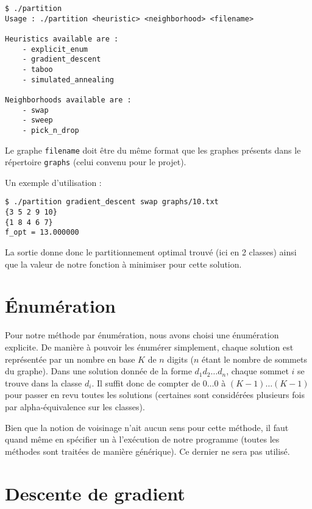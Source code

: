 \documentclass[12pt, a4paper]{article}
\begin{document}
\begin{verbatim}
$ ./partition 
Usage : ./partition <heuristic> <neighborhood> <filename>

Heuristics available are :
    - explicit_enum
    - gradient_descent
    - taboo
    - simulated_annealing

Neighborhoods available are :
    - swap
    - sweep
    - pick_n_drop
\end{verbatim}

Le graphe \texttt{filename} doit être du même format que les graphes présents dans le répertoire \texttt{graphs} (celui convenu pour le projet).

Un exemple d'utilisation :

\begin{verbatim}
$ ./partition gradient_descent swap graphs/10.txt
{3 5 2 9 10}
{1 8 4 6 7}
f_opt = 13.000000
\end{verbatim}

La sortie donne donc le partitionnement optimal trouvé (ici en 2 classes) ainsi que la valeur de notre fonction à minimiser pour cette solution.

\section{\'Enumération}
Pour notre méthode par énumération, nous avons choisi une énumération explicite. De manière à pouvoir les énumérer simplement, chaque solution est représentée par un nombre en base $K$ de $n$ digits ($n$ étant le nombre de sommets du graphe). Dans une solution donnée de la forme $d_1 d_2 \dots d_n$, chaque sommet $i$ se trouve dans la classe $d_i$. Il suffit donc de compter de $0 \dots 0$ à $(K-1) \dots (K-1)$ pour passer en revu toutes les solutions (certaines sont considérées plusieurs fois par alpha-équivalence sur les classes).

Bien que la notion de voisinage n'ait aucun sens pour cette méthode, il faut quand même en spécifier un à l'exécution de notre programme (toutes les méthodes sont traitées de manière générique). Ce dernier ne sera pas utilisé.

\section{Descente de gradient}
\end{document}
